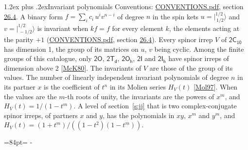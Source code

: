 \documentclass[10pt,a4paper]{article}
\makeatletter
\renewcommand\section{\@startsection{section}{1}{\z@}{-3ex plus -1ex minus -.2ex}%
  {1.2ex plus .2ex}{\normalfont\large\sffamily\bfseries\color{parttitle}}}
\newcommand{\needspace}[1]{\par\penalty-100\begingroup\dimen0=#1\relax\dimen2=\pagegoal
  \advance\dimen2-\pagetotal\ifdim\dimen0>\dimen2\relax\ifdim\dimen2>0pt\vfil\break\fi\fi
  \endgroup}
\numberwithin{equation}{section}
\newcommand{\grp}[1]{\mathsf{#1}}
\newcommand{\jm}[2]{\bigl\lvert{}^{#1}_{\,#2}\bigr\rangle}
\makeatother
\begin{document}
\section{Invariant polynomials}\label{s:invariants}
Conventions: \href{../../CONVENTIONS.pdf}{CONVENTIONS.pdf}, section \href{../../CONVENTIONS.pdf\#conv.26.4}{26.4}.
\leavevmode\label{n:local.binary.form}A binary form $f = \sum_i c_i\, u^i v^{n-i}$ of degree $n$ in the spin kets $u = \jm{1/2}{1/2}$ and $v = \jm{1/2}{-1/2}$ is invariant when $k f = f$ for every element $k$, the elements acting at the parity $+1$ (\href{../../CONVENTIONS.pdf}{CONVENTIONS.pdf}, section \href{../../CONVENTIONS.pdf\#conv.26.4}{26.4}).
\leavevmode\label{n:function.hilbert}Every spinor irrep $V$ of $\grp{2C_{10}}$ has dimension 1, the group of its matrices on $u$, $v$ being cyclic. Among the finite groups of this catalogue, only $\grp{2O}$, $\grp{2T_{d}}$, $\grp{2O_{h}}$, $\grp{2I}$ and $\grp{2I_{h}}$ have spinor irreps of dimension above 2 [\href{../../../REFERENCES.pdf\#ref.McK80}{McK80}]. The invariants of $V$ are those of the group of its values. \label{n:local.partner.x}The number of linearly independent invariant polynomials of degree $n$ in its partner $x$ is the coefficient of $t^n$ in its Molien series $H_V(t)$ [\href{../../../REFERENCES.pdf\#ref.Mol97}{Mol97}]. When the values are the $m$-th roots of unity, the invariants are the powers of $x^{m}$, and $H_V(t) = 1/(1 - t^{m})$. A level of section~\ref{s:jj} that is two complex-conjugate spinor irreps, of partners $x$ and $y$, has the polynomials in $xy$, $x^{m}$ and $y^{m}$, and $H_V(t) = (1 + t^{m})/((1 - t^{2})(1 - t^{m}))$.
\needspace{84pt}
\end{document}
